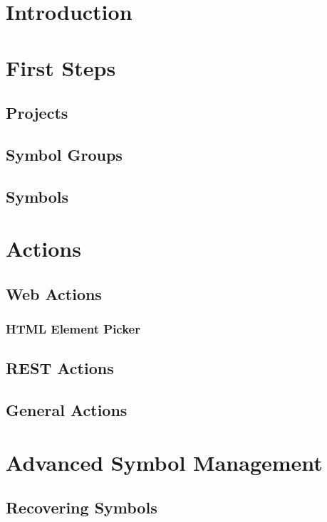 


 


\tableofcontents
\thispagestyle{empty}
\clearpage


\chapter{Introduction}
\clearpage
 
\chapter{First Steps}
\section{Projects}
\section{Symbol Groups}
\section{Symbols}
\clearpage

\chapter{Actions}
\section{Web Actions}
\subsection{HTML Element Picker}
\section{REST Actions}
\section{General Actions}
\clearpage

\chapter{Advanced Symbol Management}
\section{Recovering Symbols}
